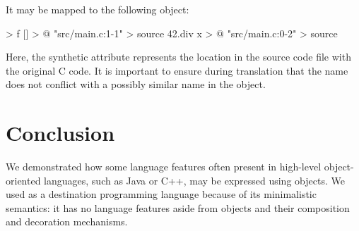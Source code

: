 \documentclass[sigplan,nonacm]{acmart}
\begin{document}
It may be mapped to the following \eolang{} object:

\begin{ffcode}
[x] > f
  [] > @
    "src/main.c:1-1" > source
    42.div x > @
  "src/main.c:0-2" > source
\end{ffcode}

Here, the synthetic  attribute represents the location in the source code file with the original C code. It is important to ensure during translation that the name  does not conflict with a possibly similar name in the object.

\section{Conclusion}

We demonstrated how some language features often present in high-level object-oriented languages, such as Java or C++, may be expressed using objects.
We used \eolang{} as a destination programming language because of its minimalistic semantics: it has no language features aside from objects and their composition and decoration mechanisms.

\raggedright


\end{document}
